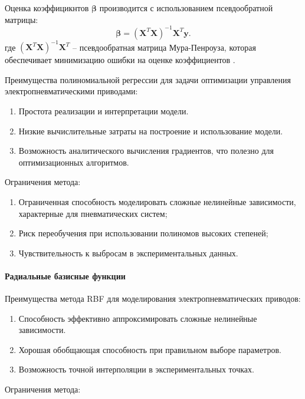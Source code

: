 Оценка коэффицикнтов $\boldsymbol{\beta}$ производится с использованием псевдообратной матрицы:
\begin{equation*}
    \boldsymbol{\beta} = (\mathbf{X}^T \mathbf{X})^{-1} \mathbf{X}^T \mathbf{y}.
\end{equation*}
где $(\mathbf{X}^T \mathbf{X})^{-1} \mathbf{X}^T$ -- псевдообратная матрица Мура-Пенроуза,
которая обеспечивает минимизацию ошибки на оценке коэффициентов \cite{meyer2009matrix}.

Преимущества полиномиальной регрессии для задачи оптимизации управления электропневматическими приводами:
\begin{enumerate}
    \item Простота реализации и интерпретации модели.
    \item Низкие вычислительные затраты на построение и использование модели.
    \item Возможность аналитического вычисления градиентов, что полезно для оптимизационных алгоритмов.
\end{enumerate}

Ограничения метода:
\begin{enumerate}
    \item Ограниченная способность моделировать сложные нелинейные зависимости, характерные для пневматических систем;
    \item Риск переобучения при использовании полиномов высоких степеней;
    \item Чувствительность к выбросам в экспериментальных данных.
\end{enumerate}

\paragraph{Радиальные базисные функции}\label{sec:ch4/sec2/subsec1/subsubsec2}


Преимущества метода RBF для моделирования электропневматических приводов:

\begin{enumerate}
    \item Способность эффективно аппроксимировать сложные нелинейные зависимости.
    \item Хорошая обобщающая способность при правильном выборе параметров.
    \item Возможность точной интерполяции в экспериментальных точках.
\end{enumerate}

Ограничения метода:

